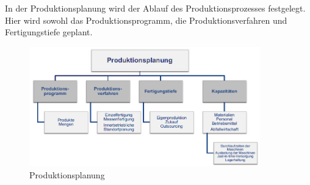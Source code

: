 \documentclass[a4paper,12pt, german]{report}
\begin{document}
In der Produktionsplanung wird der Ablauf des Produktionsprozesses festgelegt. Hier wird sowohl das Produktionsprogramm, die Produktionsverfahren und Fertigungstiefe geplant.

\begin{figure}[H]
  \center
 \includegraphics[width=10cm]{images/Produktionsplanung.png}
  \caption[Produktionsplanung]{Produktionsplanung \cite{07}}
\end{figure}
\end{document}
